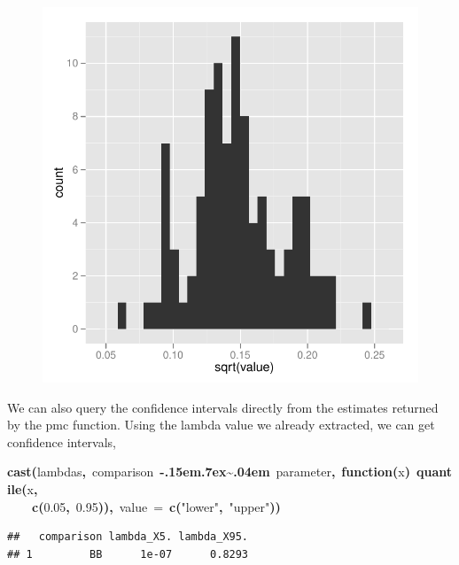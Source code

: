 \documentclass{elsarticle}
\makeatletter
\newcommand{\hlnumber}[1]{\textcolor[rgb]{0,0,0}{#1}}%
\newcommand{\hlfunctioncall}[1]{\textcolor[rgb]{.5,0,.33}{\textbf{#1}}}%
\newcommand{\hlstring}[1]{\textcolor[rgb]{.6,.6,1}{#1}}%
\newcommand{\hlkeyword}[1]{\textbf{#1}}%
\newcommand{\hlargument}[1]{\textcolor[rgb]{.69,.25,.02}{#1}}%
\newcommand{\hlformalargs}[1]{\hlargument{#1}}%
\newcommand{\hlsymbol}[1]{#1}%
\def\urltilda{\kern -.15em\lower .7ex\hbox{\~{}}\kern .04em}%
\newcommand{\hlstd}[1]{\textcolor[rgb]{0,0,0}{#1}}%
\newenvironment{kframe}{%
 \def\FrameCommand##1{\hskip\@totalleftmargin \hskip-\fboxsep
 \colorbox{shadecolor}{##1}\hskip-\fboxsep
     \hskip-\linewidth \hskip-\@totalleftmargin \hskip\columnwidth}%
 \MakeFramed {\advance\hsize-\width
   \@totalleftmargin\z@ \linewidth\hsize
   \@setminipage}}%
 {\par\unskip\endMakeFramed}
\newenvironment{knitrout}{}{} %
\makeatother
\begin{document}
\begin{figure}
\begin{center}
\begin{knitrout}
\begin{kframe}
{\centering \includegraphics{Fig1b} 

}

\end{kframe}
\end{knitrout}

\end{center}
\label{fig:oneb}
\end{figure}


We can also query the confidence intervals directly from the estimates returned by the pmc function.  Using the lambda value we already extracted, we can get confidence intervals, 

\begin{knitrout}
\color{fgcolor}\begin{kframe}
\begin{flushleft}
\ttfamily\noindent
\hlfunctioncall{cast}\hlkeyword{(}\hlsymbol{lambdas}\hlkeyword{,}{\ }\hlsymbol{comparison}{\ }\hlkeyword{\urltilda{}}{\ }\hlsymbol{parameter}\hlkeyword{,}{\ }\hlkeyword{function}\hlkeyword{(}\hlformalargs{x}\hlkeyword{)}{\ }\hlfunctioncall{quantile}\hlkeyword{(}\hlsymbol{x}\hlkeyword{,}\hspace*{\fill}\\
\hlstd{}{\ }{\ }{\ }{\ }\hlfunctioncall{c}\hlkeyword{(}\hlnumber{0.05}\hlkeyword{,}{\ }\hlnumber{0.95}\hlkeyword{)}\hlkeyword{)}\hlkeyword{,}{\ }\hlargument{value}{\ }\hlargument{=}{\ }\hlfunctioncall{c}\hlkeyword{(}\hlstring{"{}lower"{}}\hlkeyword{,}{\ }\hlstring{"{}upper"{}}\hlkeyword{)}\hlkeyword{)}\mbox{}
\normalfont
\end{flushleft}
\begin{verbatim}
##   comparison lambda_X5. lambda_X95.
## 1         BB      1e-07      0.8293
\end{verbatim}
\end{kframe}
\end{knitrout}
\end{document}
